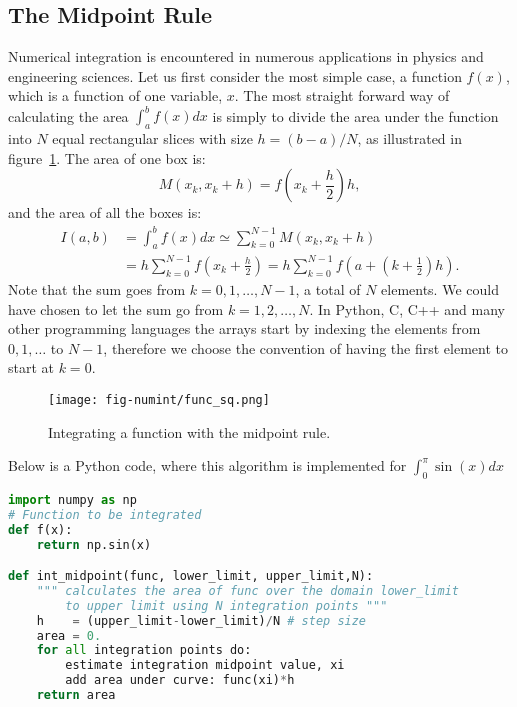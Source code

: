 \documentclass[graybox,sectrefs,envcountresetchap,open=right,final]{svmonodo}
\begin{document}
\subsection{The Midpoint Rule}
Numerical integration is encountered in numerous applications in physics and engineering sciences. 
Let us first consider the most simple case, a function $f(x)$, which is a function of one variable, $x$. The most straight forward way of calculating the area $\int_a^bf(x)dx$ is 
simply to divide the area under the function into $N$ equal rectangular slices with size $h=(b-a)/N$, as illustrated in figure~\ref{fig:numint:mid}. The area of one box is:
\begin{equation}
M(x_k,x_k+h)=f(x_k+\frac{h}{2}) h,\label{eq:numint:mid0}
\end{equation}
and the area of all the boxes is:
\begin{align}
I(a,b)&=\int_a^bf(x)dx\simeq\sum_{k=0}^{N-1}M(x_k,x_k+h)\nonumber\\ 
&=h\sum_{k=0}^{N-1}f(x_k+\frac{h}{2})=h\sum_{k=0}^{N-1}f(a+(k+\frac{1}{2})h).
\label{eq:numint:mid1}
\end{align}
Note that the sum goes from $k=0,1,\ldots,N-1$, a total of $N$ elements. We could have chosen to let the sum go from $k=1,2,\ldots,N$. 
In Python, C, C++ and many other programming languages the arrays start by indexing the elements from $0,1,\ldots$ to $N-1$, 
therefore we choose the convention of having the first element to start at $k=0$.


\begin{figure}[!ht]  %
  \centerline{\texttt{[image: fig-numint/func\_sq.png]}}
  \caption{
  Integrating a function with the midpoint rule. \label{fig:numint:mid}
  }
\end{figure}


Below is a Python code, where this algorithm is implemented for $\int_0^\pi\sin (x)dx$
\begin{lstlisting}[language=Python,style=blue1bar]
import numpy as np
# Function to be integrated
def f(x):
    return np.sin(x)

def int_midpoint(func, lower_limit, upper_limit,N):
    """ calculates the area of func over the domain lower_limit
        to upper limit using N integration points """
    h    = (upper_limit-lower_limit)/N # step size 
    area = 0.
    for all integration points do:
        estimate integration midpoint value, xi
        add area under curve: func(xi)*h
    return area
\end{lstlisting}
\end{document}
